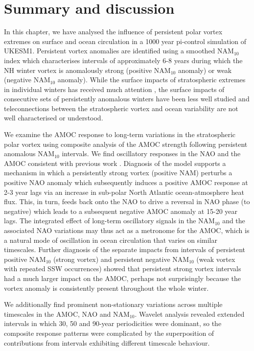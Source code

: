 \section{Summary and discussion}
In this chapter, we have analysed the influence of persistent polar vortex extremes on surface and ocean circulation in a 1000 year pi-control simulation of UKESM1. Persistent vortex anomalies are identified using a smoothed NAM$_{10}$ index which characterises intervals of approximately 6-8 years during which the NH winter vortex is anomalously strong (positive NAM$_{10}$ anomaly) or weak (negative NAM$_{10}$ anomaly). While the surface impacts of stratospheric extremes in individual winters has received much attention \citep{baldwinStratospheric2001a, domeisenEstimating2019d, charlton-perezInfluence2018e}, the surface impacts of consecutive sets of persistently anomalous winters have been less well studied and teleconnections between the stratospheric vortex and ocean variability are not well characterised or understood. 

We examine the AMOC response to long-term variations in the stratospheric polar vortex using composite analysis of the AMOC strength following persistent anomalous NAM$_{10}$ intervals. We find oscillatory responses in the NAO and the AMOC consistent with previous work \citep{reichlerStratospheric2012b}. Diagnosis of the model supports a mechanism in which a persistently strong vortex (positive NAM) perturbs a positive NAO anomaly which subsequently induces a positive AMOC response at 2-3 year lags via an increase in sub-polar North Atlantic ocean-atmosphere heat flux. This, in turn, feeds back onto the NAO to drive a reversal in  NAO phase (to negative) which leads to a subsequent negative AMOC anomaly at 15-20 year lags. The integrated effect of long-term oscillatory signals in the NAM$_{10}$ and the associated NAO variations may thus act as a metronome for the AMOC, which is a natural mode of oscillation in  ocean circulation that varies on similar timescales. Further diagnosis of the separate impacts from intervals of persistent positive NAM$_{10}$ (strong vortex) and persistent negative NAM$_{10}$ (weak vortex with repeated SSW occurrences) showed that persistent strong vortex intervals had a much larger impact on the AMOC, perhaps not surprisingly because the vortex anomaly is consistently present throughout the whole winter.

We additionally find prominent non-stationary variations across multiple timescales in the AMOC, NAO and NAM$_{10}$. Wavelet analysis revealed extended intervals in  which 30, 50 and 90-year periodicities were dominant, so the composite response patterns were complicated by  the superposition of contributions from intervals exhibiting different timescale behaviour. 

